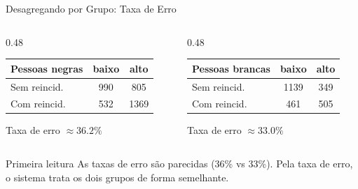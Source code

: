 \documentclass[aspectratio=169,xcolor=dvipsnames]{beamer}
\begin{document}
  \begin{frame}{Desagregando por Grupo: Taxa de Erro}
    \centering
    \renewcommand{\arraystretch}{1.25}
    \begin{columns}[T]
      \begin{column}{0.48\textwidth}
        \centering
        \small
        \begin{tabular}{lcc}
          \toprule
          \textbf{Pessoas negras} & \textbf{baixo} & \textbf{alto} \\
          \midrule
          Sem reincid. & 990 & 805 \\
          Com reincid. & 532 & 1369 \\
          \bottomrule
        \end{tabular}

        \vspace{0.5em}
        Taxa de erro $\approx 36.2\%$
      \end{column}
      \begin{column}{0.48\textwidth}
        \centering
        \small
        \begin{tabular}{lcc}
          \toprule
          \textbf{Pessoas brancas} & \textbf{baixo} & \textbf{alto} \\
          \midrule
          Sem reincid. & 1139 & 349 \\
          Com reincid. & 461 & 505 \\
          \bottomrule
        \end{tabular}

        \vspace{0.5em}
        Taxa de erro $\approx 33.0\%$
      \end{column}
    \end{columns}

    \vspace{0.8em}
    \begin{block}{Primeira leitura}
      As taxas de erro são parecidas (36\% vs 33\%). Pela taxa de erro, o sistema trata os dois grupos de forma semelhante.
    \end{block}
  \end{frame}
\end{document}
